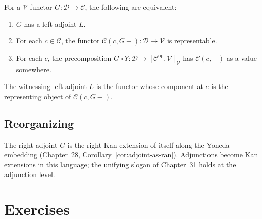 \begin{theorem}
\label{thm:adj-yoneda}
For a $\mathcal{V}$-functor $G : \mathcal{D} \to \mathcal{C}$, the following
are equivalent:
\begin{enumerate}
  \item $G$ has a left adjoint $L$.
  \item For each $c \in \mathcal{C}$, the functor $\mathcal{C}(c, G-) :
        \mathcal{D} \to \mathcal{V}$ is representable.
  \item For each $c$, the precomposition $G \circ Y : \mathcal{D} \to
        [\mathcal{C}^{\mathrm{op}}, \mathcal{V}]_\mathcal{V}$ has $\mathcal{C}(c, -)$
        as a value somewhere.
\end{enumerate}
The witnessing left adjoint $L$ is the functor whose component at $c$ is
the representing object of $\mathcal{C}(c, G-)$.
\end{theorem}

\subsection{Reorganizing}

\begin{remark}
The right adjoint $G$ is the right Kan extension of itself along the Yoneda
embedding (Chapter~28, Corollary~\ref{cor:adjoint-as-ran}). Adjunctions
become Kan extensions in this language; the unifying slogan of Chapter~31
holds at the adjunction level.
\end{remark}


\section{Exercises}
\label{sec:adj-formal-exercises}

